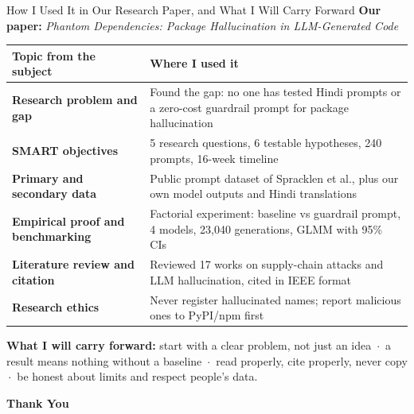 \documentclass[aspectratio=169,10pt]{beamer}
\begin{document}
\begin{frame}{How I Used It in Our Research Paper, and What I Will Carry Forward}
\small
\textbf{Our paper:} \emph{Phantom Dependencies: Package Hallucination in LLM-Generated Code}

\smallskip
\scriptsize
\begin{tabular}{@{}>{\bfseries}p{}p{}@{}}
\toprule
Topic from the subject & Where I used it \\
\midrule
Research problem and gap & Found the gap: no one has tested Hindi prompts or a zero-cost guardrail prompt for package hallucination \\
SMART objectives & 5 research questions, 6 testable hypotheses, 240 prompts, 16-week timeline \\
Primary and secondary data & Public prompt dataset of Spracklen et al., plus our own model outputs and Hindi translations \\
Empirical proof and benchmarking & Factorial experiment: baseline vs guardrail prompt, 4 models, 23,040 generations, GLMM with 95\% CIs \\
Literature review and citation & Reviewed 17 works on supply-chain attacks and LLM hallucination, cited in IEEE format \\
Research ethics & Never register hallucinated names; report malicious ones to PyPI/npm first \\
\bottomrule
\end{tabular}

\medskip
\small
\textbf{What I will carry forward:} start with a clear problem, not just an idea \,$\cdot$\, a result means nothing without a baseline \,$\cdot$\, read properly, cite properly, never copy \,$\cdot$\, be honest about limits and respect people's data.

\smallskip
\centering\textbf{Thank You}
\end{frame}
\end{document}
